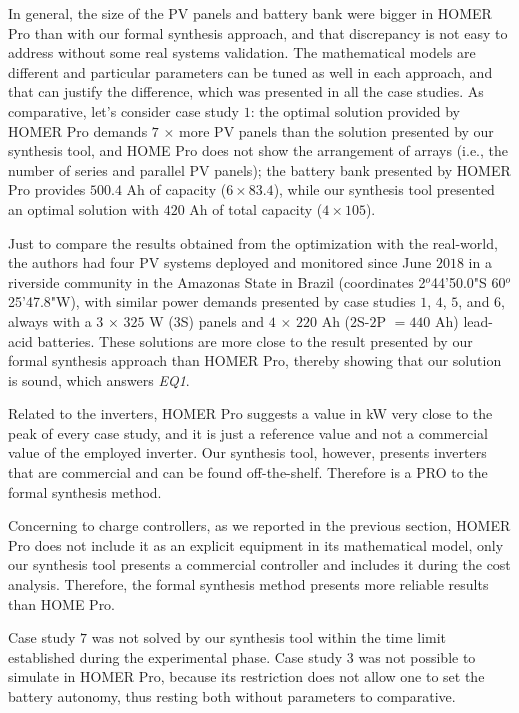 \documentclass[journal]{IEEEtran}
\begin{document}
In general, the size of the PV panels and battery bank were 
bigger in HOMER Pro than with our formal synthesis approach, 
and that discrepancy is not easy to address without some real 
systems validation. The mathematical models are different and 
particular parameters can be tuned as well in each approach, 
and that can justify the difference, which was presented in all 
the case studies. As comparative, let's consider case study $1$: 
the optimal solution provided by HOMER Pro demands $7$ $\times$ 
more PV panels than the solution presented by our synthesis tool, 
and HOME Pro does not show the arrangement of arrays 
(i.e., the number of series and parallel PV panels); 
the battery bank presented by HOMER Pro provides $500.4$ Ah 
of capacity ($6 \times 83.4$), while our synthesis tool 
presented an optimal solution with $420$ Ah of total capacity 
($4 \times 105$). 

Just to compare the results obtained from the optimization 
with the real-world, the authors had four PV systems deployed 
and monitored since June $2018$ in a riverside community 
in the Amazonas State in Brazil (coordinates 2$^{o}$44'50.0"S 60$^{o}$25'47.8"W), with similar power demands 
presented by case studies $1$, $4$, $5$, and $6$, 
always with a $3$ $\times$ $325$ W ($3$S) panels and 
$4$ $\times$ $220$ Ah ($2$S-$2$P $= 440$ Ah) 
lead-acid batteries. These solutions are more close 
to the result presented by our formal synthesis 
approach than HOMER Pro, thereby showing that our 
solution is sound, which answers \textit{EQ1}.

Related to the inverters, HOMER Pro suggests a value in 
kW very close to the peak of every case study, and it 
is just a reference value and not a commercial value of 
the employed inverter. Our synthesis tool, however, 
presents inverters that are commercial and can be found 
off-the-shelf. Therefore is a PRO to the formal synthesis method.

Concerning to charge controllers, as we reported in 
the previous section, HOMER Pro does not include it 
as an explicit equipment in its mathematical model, 
only our synthesis tool presents a commercial controller 
and includes it during the cost analysis. Therefore, 
the formal synthesis method presents more reliable results than
HOME Pro.

Case study $7$ was not solved by our synthesis tool 
within the time limit established during the experimental 
phase. Case study $3$ was not possible to simulate in HOMER Pro, 
because its restriction does not allow one to set the battery autonomy, 
thus resting both without parameters to comparative.
\end{document}
